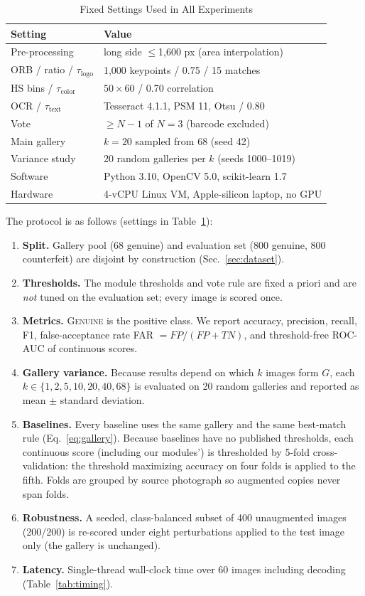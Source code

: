 \documentclass[conference]{IEEEtran}
\begin{document}
\begin{table}[t]
\caption{Fixed Settings Used in All Experiments}
\label{tab:settings}
\centering
\setlength{\tabcolsep}{4pt}
\begin{tabular}{ll}
\toprule
Setting & Value \\
\midrule
Pre-processing & long side $\leq$1{,}600 px (area interpolation) \\
ORB / ratio / $\tau_{\text{logo}}$ & 1{,}000 keypoints / 0.75 / 15 matches \\
HS bins / $\tau_{\text{color}}$ & $50\times60$ / 0.70 correlation \\
OCR / $\tau_{\text{text}}$ & Tesseract 4.1.1, PSM 11, Otsu / 0.80 \\
Vote & $\geq N{-}1$ of $N{=}3$ (barcode excluded) \\
Main gallery & $k{=}20$ sampled from 68 (seed 42) \\
Variance study & 20 random galleries per $k$ (seeds 1000--1019) \\
Software & Python 3.10, OpenCV 5.0, scikit-learn 1.7 \\
Hardware & 4-vCPU Linux VM, Apple-silicon laptop, no GPU \\
\bottomrule
\end{tabular}
\end{table}

The protocol is as follows (settings in Table~\ref{tab:settings}):
\begin{enumerate}
\item \textbf{Split.} Gallery pool (68 genuine) and evaluation set (800
genuine, 800 counterfeit) are disjoint by construction
(Sec.~\ref{sec:dataset}).
\item \textbf{Thresholds.} The module thresholds and vote rule are fixed a
priori and are \emph{not} tuned on the evaluation set; every image is
scored once.
\item \textbf{Metrics.} \textsc{Genuine} is the positive class. We report
accuracy, precision, recall, F1, false-acceptance rate
FAR $=FP/(FP+TN)$, and threshold-free ROC-AUC of continuous scores.
\item \textbf{Gallery variance.} Because results depend on which $k$
images form $G$, each $k\in\{1,2,5,10,20,40,68\}$ is evaluated on 20
random galleries and reported as mean $\pm$ standard deviation.
\item \textbf{Baselines.} Every baseline uses the same gallery and the
same best-match rule (Eq.~\ref{eq:gallery}). Because baselines have no
published thresholds, each continuous score (including our modules') is
thresholded by 5-fold cross-validation: the threshold maximizing accuracy
on four folds is applied to the fifth. Folds are grouped by source
photograph so augmented copies never span folds.
\item \textbf{Robustness.} A seeded, class-balanced subset of 400
unaugmented images (200/200) is re-scored under eight perturbations
applied to the test image only (the gallery is unchanged).
\item \textbf{Latency.} Single-thread wall-clock time over 60 images
including decoding (Table~\ref{tab:timing}).
\end{enumerate}
\end{document}
